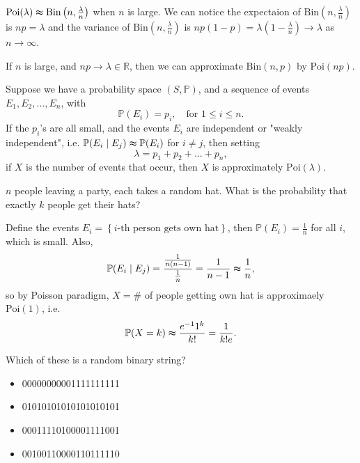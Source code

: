 \begin{remark}
    \(\mathrm{Poi}(\lambda ) \thickapprox \mathrm{Bin} \left( n, \frac{\lambda}{n} \right)   \) when \(n\) is large. We can notice the expectaion of \(\mathrm{Bin} \left( n, \frac{\lambda}{n} \right)  \) is \(n p = \lambda \) and the variance of \(\mathrm{Bin} \left( n, \frac{\lambda}{n} \right)  \) is \(np(1 - p) = \lambda \left( 1 - \frac{\lambda}{n} \right) \to \lambda  \) as \(n \to \infty\).      
\end{remark}

\begin{remark}
    If \(n\) is large, and \(np \to \lambda \in \mathbb{R} \), then we can approximate \(\mathrm{Bin}(n, p) \) by \(\mathrm{Poi}(np) \).    
\end{remark}

\begin{eg}
    Suppose we have a probability space \((S, \mathbb{P})\), and a sequence of events \(E_1, E_2, \dots , E_n\), with 
    \[
        \mathbb{P} (E_i) = p_i, \quad \text{for } 1 \le i \le n.
    \]  
    If the \(p_i\)'s are all small, and the events \(E_i\) are independent or "weakly independent", i.e. \(\mathbb{P} (E_i \mid E_j) \thickapprox \mathbb{P} (E_i)\) for \(i \neq j\), then setting 
    \[
        \lambda = p_1 + p_2 + \dots + p_n,
    \]    
    if \(X\) is the number of events that occur, then \(X\) is approximately \(\mathrm{Poi}(\lambda ) \).   
\end{eg}

\begin{eg}
    \(n\) people leaving a party, each takes a random hat. What is the probability that exactly \(k\) people get their hats?  
\end{eg}
\begin{explanation}
    Define the events \(E_i = \left\{ i\text{-th person gets own hat}  \right\} \), then \(\mathbb{P} (E_i) = \frac{1}{n}\) for all \(i\), which is small. Also, 
    \[
        \mathbb{P} (E_i \mid E_j) = \frac{\frac{1}{n(n-1)}}{\frac{1}{n}} = \frac{1}{n-1} \thickapprox \frac{1}{n},
    \]  
    so by Poisson paradigm, \(X = \# \) of people getting own hat is approximaely \(\mathrm{Poi}(1) \), i.e. 
    \[
        \mathbb{P} (X = k) \thickapprox \frac{e^{-1} 1^k}{k!} = \frac{1}{k! e}.
    \]    
\end{explanation}

\begin{eg}
    Which of these is a random binary string?
    \begin{itemize}
        \item [(a)] 00000000001111111111
        \item [(b)] 01010101010101010101
        \item [(c)] 00011110100001111001
        \item [(d)] 00100110000110111110
    \end{itemize}
\end{eg}

